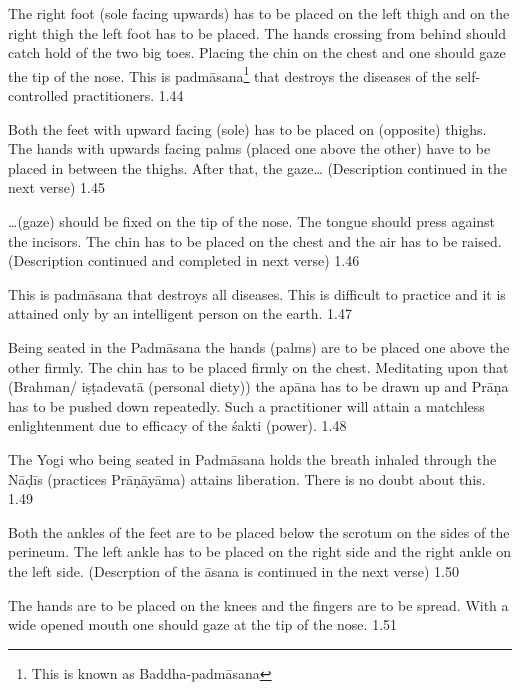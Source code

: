 The right foot (sole facing upwards) has to be placed on the left thigh and on the right thigh the left foot has to be placed. The hands crossing from behind should catch hold of the two big toes. Placing the chin on the chest and one should gaze the tip of the nose. This is padmāsana\footnote{This is known as Baddha-padmāsana} that destroys the diseases of the self-controlled practitioners. 1.44


Both the feet with upward facing (sole) has to be placed on (opposite) thighs. The hands with upwards facing palms (placed one above the other) have to be placed in between the thighs. After that, the gaze… (Description continued in the next verse) 1.45

…(gaze) should be fixed on the tip of the nose. The tongue should press against the incisors. The chin has to be placed on the chest and the air has to be raised. (Description continued and completed in next verse) 1.46

This is padmāsana that destroys all diseases. This is difficult to practice and it is attained only by an intelligent person on the earth.  1.47


Being seated in the Padmāsana the hands (palms) are to be placed one above the other firmly. The chin has to be placed firmly on the chest. Meditating upon that (Brahman/ iṣṭadevatā (personal diety)) the apāna has to be drawn up and Prāṇa has to be pushed down repeatedly. Such a practitioner will attain a matchless enlightenment due to efficacy of the śakti (power). 1.48


The Yogi who being seated in Padmāsana holds the breath inhaled through the Nāḍīs (practices Prāṇāyāma) attains liberation. There is no doubt about this. 1.49
\medskip


Both the ankles of the feet are to be placed below the scrotum on the sides of the perineum. The left ankle has to be placed on the right side and the right ankle on the left side. (Descrption of the āsana is continued in the next verse) 1.50

The hands are to be placed on the knees and the fingers are to be spread. With a wide opened mouth one should gaze at the tip of the nose. 1.51


